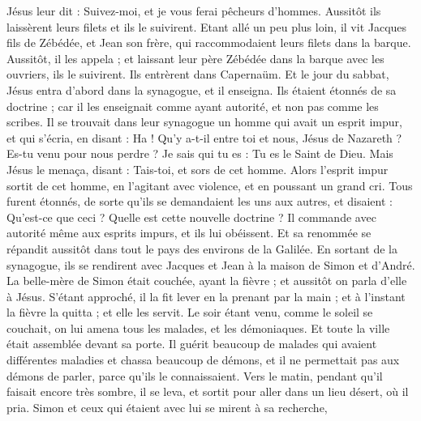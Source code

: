 \begin{multicols}{2}
Jésus leur dit : Suivez-moi, et je vous ferai pêcheurs d'hommes.
Aussitôt ils laissèrent leurs filets et ils le suivirent.
Etant allé un peu plus loin, il vit Jacques fils de Zébédée, et Jean son frère, qui raccommodaient leurs filets dans la barque.
Aussitôt, il les appela ; et laissant leur père Zébédée dans la barque avec les ouvriers, ils le suivirent.
Ils entrèrent dans Capernaüm. Et le jour du sabbat, Jésus entra d’abord dans la synagogue, et il enseigna.
Ils étaient étonnés de sa doctrine ; car il les enseignait comme ayant autorité, et non pas comme les scribes.
Il se trouvait dans leur synagogue un homme qui avait un esprit impur, et qui s'écria,
en disant : Ha ! Qu’y a-t-il entre toi et nous, Jésus de Nazareth ? Es-tu venu pour nous perdre ? Je sais qui tu es : Tu es le Saint de Dieu.
Mais Jésus le menaça, disant : Tais-toi, et sors de cet homme.
Alors l'esprit impur sortit de cet homme, en l’agitant avec violence, et en poussant un grand cri.
Tous furent étonnés, de sorte qu'ils se demandaient les uns aux autres, et disaient : Qu'est-ce que ceci ? Quelle est cette nouvelle doctrine ? Il commande avec autorité même aux esprits impurs, et ils lui obéissent.
Et sa renommée se répandit aussitôt dans tout le pays des environs de la Galilée.
En sortant de la synagogue, ils se rendirent avec Jacques et Jean à la maison de Simon et d'André.
La belle-mère de Simon était couchée, ayant la fièvre ; et aussitôt on parla d’elle à Jésus.
S’étant approché, il la fit lever en la prenant par la main ; et à l'instant la fièvre la quitta ; et elle les servit.
Le soir étant venu, comme le soleil se couchait, on lui amena tous les malades, et les démoniaques.
Et toute la ville était assemblée devant sa porte.
Il guérit beaucoup de malades qui avaient différentes maladies et chassa beaucoup de démons, et il ne permettait pas aux démons de parler, parce qu’ils le connaissaient.
Vers le matin, pendant qu’il faisait encore très sombre, il se leva, et sortit pour aller dans un lieu désert, où il pria.
Simon et ceux qui étaient avec lui se mirent à sa recherche,

\end{multicols}
